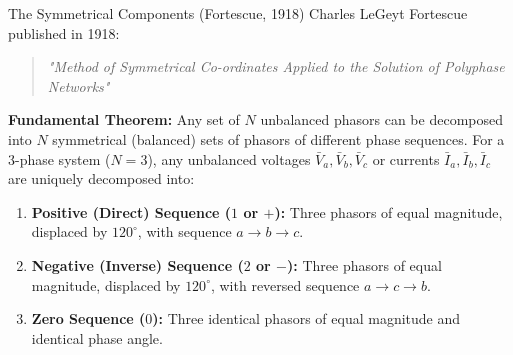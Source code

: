 \begin{frame}[allowframebreaks]{The Symmetrical Components (Fortescue, 1918)}
    Charles LeGeyt Fortescue published in 1918:
    \begin{quote}
        \large
        \textit{"Method of Symmetrical Co-ordinates Applied to the Solution of Polyphase Networks"}
    \end{quote}

    \textbf{Fundamental Theorem:} Any set of $N$ unbalanced phasors can be decomposed into $N$ symmetrical (balanced) sets of phasors of different phase sequences.
 \newpage 
    For a 3-phase system ($N=3$), any unbalanced voltages $\bar{V}_a, \bar{V}_b, \bar{V}_c$ or currents $\bar{I}_a, \bar{I}_b, \bar{I}_c$ are uniquely decomposed into:
    \begin{enumerate}
        \item \textbf{Positive (Direct) Sequence ($1$ or $+$):} Three phasors of equal magnitude, displaced by $120^\circ$, with sequence $a \to b \to c$.
        \item \textbf{Negative (Inverse) Sequence ($2$ or $-$):} Three phasors of equal magnitude, displaced by $120^\circ$, with reversed sequence $a \to c \to b$.
        \item \textbf{Zero Sequence ($0$):} Three identical phasors of equal magnitude and identical phase angle.
    \end{enumerate}
\end{frame}

